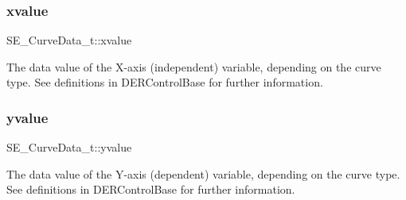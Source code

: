 \subsubsection{\texorpdfstring{xvalue}{xvalue}}
{\footnotesize\ttfamily S\+E\+\_\+\+Curve\+Data\+\_\+t\+::xvalue}

The data value of the X-\/axis (independent) variable, depending on the curve type. See definitions in D\+E\+R\+Control\+Base for further information. \mbox{\label{group__CurveData_gaa753c6f9b2f10fb00d90d2aa26ed0489}} 
\subsubsection{\texorpdfstring{yvalue}{yvalue}}
{\footnotesize\ttfamily S\+E\+\_\+\+Curve\+Data\+\_\+t\+::yvalue}

The data value of the Y-\/axis (dependent) variable, depending on the curve type. See definitions in D\+E\+R\+Control\+Base for further information. 